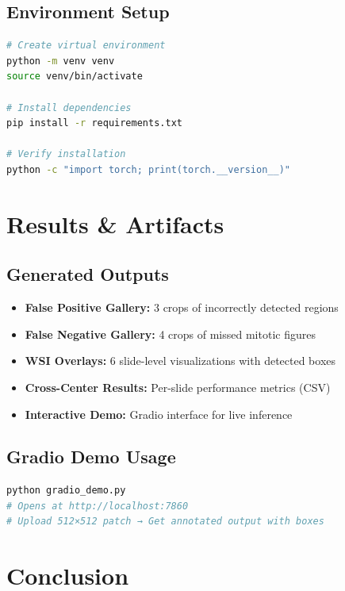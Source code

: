 \documentclass[11pt,a4paper]{article}
\begin{document}
\subsection{Environment Setup}

\begin{lstlisting}[language=bash]
# Create virtual environment
python -m venv venv
source venv/bin/activate

# Install dependencies
pip install -r requirements.txt

# Verify installation
python -c "import torch; print(torch.__version__)"
\end{lstlisting}

\section{Results \& Artifacts}

\subsection{Generated Outputs}

\begin{itemize}
    \item \textbf{False Positive Gallery:} 3 crops of incorrectly detected regions
    \item \textbf{False Negative Gallery:} 4 crops of missed mitotic figures
    \item \textbf{WSI Overlays:} 6 slide-level visualizations with detected boxes
    \item \textbf{Cross-Center Results:} Per-slide performance metrics (CSV)
    \item \textbf{Interactive Demo:} Gradio interface for live inference
\end{itemize}

\subsection{Gradio Demo Usage}

\begin{lstlisting}[language=bash]
python gradio_demo.py
# Opens at http://localhost:7860
# Upload 512×512 patch → Get annotated output with boxes
\end{lstlisting}

\section{Conclusion}
\end{document}
